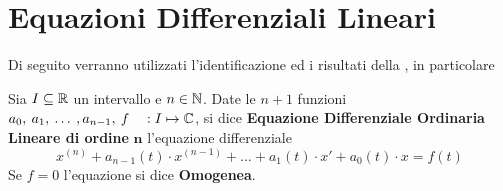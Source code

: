 \color{not_explained_section_color}
\section{Equazioni Differenziali Lineari}
Di seguito verranno utilizzati l'identificazione ed i risultati della , in particolare 
\begin{definition}
	Sia $I \subseteq \mathbb{R}$ un intervallo e $n \in \mathbb{N}$. Date le $n + 1$ funzioni $a_0,\:a_1,\:\dotsc\:,a_{n-1},\:f \quad : I \mapsto \mathbb{C}$, si dice \textbf{Equazione Differenziale Ordinaria Lineare di ordine} $\boldsymbol{n}$ l'equazione differenziale
	$$x^{(n)} + a_{n-1}(t) \cdot x^{(n-1)} + \dotsc + a_{1}(t) \cdot x' + a_{0}(t) \cdot x = f(t)$$
	Se $f = 0$ l'equazione si dice \textbf{Omogenea}.
\end{definition}

